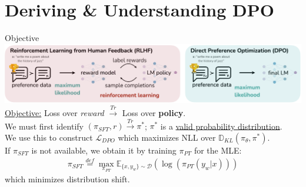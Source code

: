 \documentclass{beamer}
\begin{document}
\section{Deriving \& Understanding DPO}
\begin{frame}{Objective}
	\includegraphics[width=\textwidth]{img/dpo-vs-rlhf.png} \pause \newline \\

	\underline{Objective:} Loss over \textit{reward} $\stackrel{Tr}{\rightarrow}$ Loss over \textbf{policy}. \pause \newline \\
	We must first identify $(\pi_{SFT},r) \stackrel{Tr}{\rightarrow} \pi^*$; $\pi^*$ is a \underline{valid probability distribution}. \pause \newline \\

	We use this to construct $\mathcal{L}_{DPO}$ which maximizes NLL over $\mathbb{D}_{KL}(\pi_\theta, \pi^*)$. \pause \newline \\

	If $\pi_{SFT}$ is not available, we obtain it by training $\pi_{PT}$ for the MLE:
	\begin{gather}
		\pi_{SFT} \stackrel{def}{=} \max_{\pi_{PT}} \mathbb{E}_{\{x, y_w\} \sim \mathcal{D}}(\log(\pi_{PT}(y_w|x)))
	\end{gather}
	which minimizes distribution shift.
\end{frame}
\end{document}

